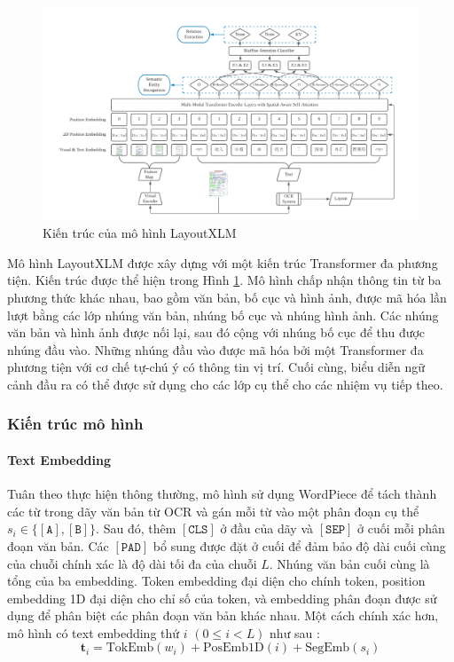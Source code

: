 \begin{figure}[h]
    \includegraphics[scale=0.42]{chapter2/images/layoutxml-architecture.png}
    \caption{Kiến trúc của mô hình LayoutXLM}
    \label{layoutxml}
\end{figure}

Mô hình LayoutXLM được xây dựng với một kiến trúc Transformer đa phương tiện. Kiến trúc được thể hiện trong Hình \ref{layoutxml}. Mô hình chấp nhận thông tin từ ba phương thức khác nhau, bao gồm văn bản, bố cục và hình ảnh, được mã hóa lần lượt bằng các lớp nhúng văn bản, nhúng bố cục và nhúng hình ảnh. Các nhúng văn bản và hình ảnh được nối lại, sau đó cộng với nhúng bố cục để thu được nhúng đầu vào. Những nhúng đầu vào được mã hóa bởi một Transformer đa phương tiện với cơ chế tự-chú ý có thông tin vị trí. Cuối cùng, biểu diễn ngữ cảnh đầu ra có thể được sử dụng cho các lớp cụ thể cho các nhiệm vụ tiếp theo. 

\subsubsection{Kiến trúc mô hình}
\paragraph*{Text Embedding}
Tuân theo thực hiện thông thường, mô hình sử dụng WordPiece để tách thành các từ trong dãy văn bản từ OCR và gán mỗi từ vào một phân đoạn cụ thể $s_i \in \{\mathtt{[A]}, \mathtt{[B]}\}$. Sau đó, thêm $\mathtt{[CLS]}$ ở đầu của dãy và $\mathtt{[SEP]}$ ở cuối mỗi phân đoạn văn bản. Các $\mathtt{[PAD]}$ bổ sung được đặt ở cuối để đảm bảo độ dài cuối cùng của chuỗi chính xác là độ dài tối đa của chuỗi $L$. Nhúng văn bản cuối cùng là tổng của ba embedding. Token embedding đại diện cho chính token, position embedding 1D đại diện cho chỉ số của token, và embedding phân đoạn được sử dụng để phân biệt các phân đoạn văn bản khác nhau. Một cách chính xác hơn, mô hình có text embedding thứ $i$ $(0 \leq i < L)$ như sau \cite{xu2022layoutlmv2}:
\[
    \mathbf{t}_i = \text{TokEmb}(w_i) + \text{PosEmb1D}(i) + \text{SegEmb}(s_i)
\]

